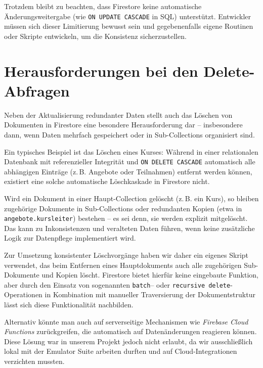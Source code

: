 \documentclass[12pt,a4paper%
              ,oneside     %
              ,titlepage
              ,DIV=13
              ,headinclude
              ,footinclude=false%
              ,cleardoublepage=empty%
              ,parskip=half,
              BCOR=0mm,
              ]{scrreprt}
\begin{document}
Trotzdem bleibt zu beachten, dass Firestore keine automatische Änderungsweitergabe (wie \texttt{ON UPDATE CASCADE} in SQL) unterstützt. Entwickler müssen sich dieser Limitierung bewusst sein und gegebenenfalls eigene Routinen oder Skripte entwickeln, um die Konsistenz sicherzustellen.

\chapter{Herausforderungen bei den Delete-Abfragen}
\label{delete-label}

Neben der Aktualisierung redundanter Daten stellt auch das Löschen von Dokumenten in Firestore eine besondere Herausforderung dar – insbesondere dann, wenn Daten mehrfach gespeichert oder in Sub-Collections organisiert sind.

Ein typisches Beispiel ist das Löschen eines Kurses: Während in einer relationalen Datenbank mit referenzieller Integrität und \texttt{ON DELETE CASCADE} automatisch alle abhängigen Einträge (z.\,B. Angebote oder Teilnahmen) entfernt werden können, existiert eine solche automatische Löschkaskade in Firestore nicht.

Wird ein Dokument in einer Haupt-Collection gelöscht (z.\,B. ein Kurs), so bleiben zugehörige Dokumente in Sub-Collections oder redundanten Kopien (etwa in \texttt{angebote.kursleiter}) bestehen – es sei denn, sie werden explizit mitgelöscht. Das kann zu Inkonsistenzen und veralteten Daten führen, wenn keine zusätzliche Logik zur Datenpflege implementiert wird.

Zur Umsetzung konsistenter Löschvorgänge haben wir daher ein eigenes Skript verwendet, das beim Entfernen eines Hauptdokuments auch alle zugehörigen Sub-Dokumente und Kopien löscht. Firestore bietet hierfür keine eingebaute Funktion, aber durch den Einsatz von sogenannten \texttt{batch}– oder \texttt{recursive delete}-Operationen in Kombination mit manueller Traversierung der Dokumentstruktur lässt sich diese Funktionalität nachbilden.

Alternativ könnte man auch auf serverseitige Mechanismen wie \textit{Firebase Cloud Functions} zurückgreifen, die automatisch auf Datenänderungen reagieren können. Diese Lösung war in unserem Projekt jedoch nicht erlaubt, da wir ausschließlich lokal mit der Emulator Suite arbeiten durften und auf Cloud-Integrationen verzichten mussten.
\end{document}
